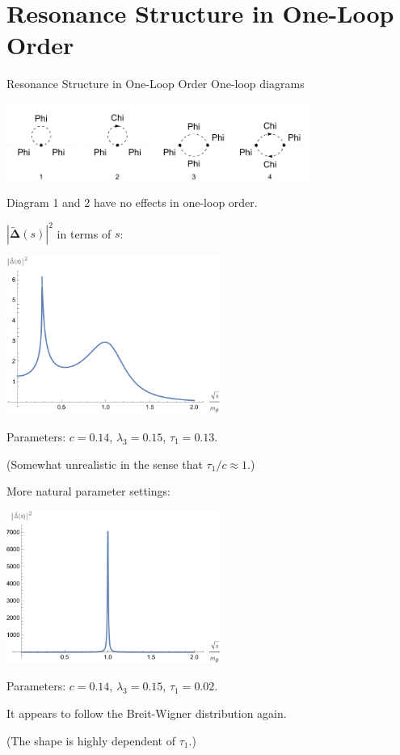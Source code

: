 \documentclass[10pt]{beamer}
\begin{document}
	\section{Resonance Structure in One-Loop Order}
	\begin{frame}{Resonance Structure in One-Loop Order}
		One-loop diagrams
		\begin{center}
			\includegraphics[width=10cm]{loopdiags.pdf}
		\end{center}
		Diagram 1 and 2 have no effects in one-loop order.
	\end{frame}
	
	\begin{frame}
		$|\tilde{\pmb{\Delta}}(s)|^{2}$ in terms of $s$:
		\begin{center}
			\includegraphics[width=7cm]{resonance1.pdf}
		\end{center}
		Parameters: $c=0.14$, $\lambda_{3}=0.15$, $\tau_{1}=0.13$.
		
		(Somewhat unrealistic in the sense that $\tau_{1}/c\approx 1$.)
	\end{frame}
	
	\begin{frame}
		More natural parameter settings:
		\begin{center}
			\includegraphics[width=7cm]{resonance2.pdf}
		\end{center}
		Parameters: $c=0.14$, $\lambda_{3}=0.15$, $\tau_{1}=0.02$.
		
		It appears to follow the Breit-Wigner distribution again.
		
		(The shape is highly dependent of $\tau_{1}$.)
	\end{frame}
	
\end{document}
